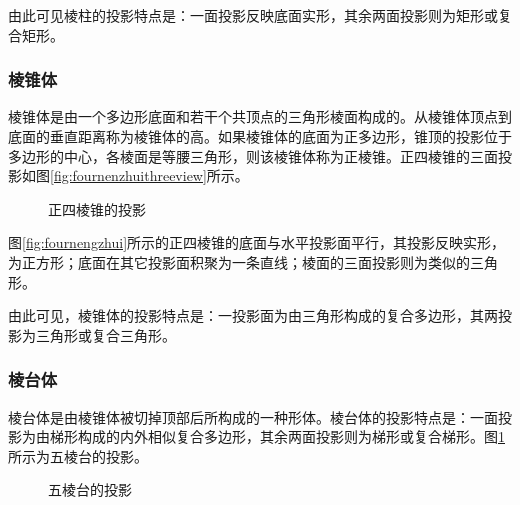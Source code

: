 由此可见棱柱的投影特点是：一面投影反映底面实形，其余两面投影则为矩形或复合矩形。
\subsubsection{棱锥体}
棱锥体是由一个多边形底面和若干个共顶点的三角形棱面构成的。从棱锥体顶点到底面的垂直距离称为棱锥体的高。如果棱锥体的底面为正多边形，锥顶的投影位于多边形的中心，各棱面是等腰三角形，则该棱锥体称为正棱锥。正四棱锥的三面投影如图\ref{fig:fournenzhuithreeview}所示。

\begin{figure}[htbp]
\centering
{}\hspace{30pt}
\caption{正四棱锥的投影}
\end{figure}

图\ref{fig:fournengzhui}所示的正四棱锥的底面与水平投影面平行，其投影反映实形，为正方形；底面在其它投影面积聚为一条直线；棱面的三面投影则为类似的三角形。

由此可见，棱锥体的投影特点是：一投影面为由三角形构成的复合多边形，其两投影为三角形或复合三角形。
\subsubsection{棱台体}
棱台体是由棱锥体被切掉顶部后所构成的一种形体。棱台体的投影特点是：一面投影为由梯形构成的内外相似复合多边形，其余两面投影则为梯形或复合梯形。图\ref{fig:fivenentai} 所示为五棱台的投影。
\begin{figure}[htbp]
\centering
{}\hspace{30pt}
\caption{五棱台的投影}\label{fig:fivenentai}
\end{figure}

\endinput